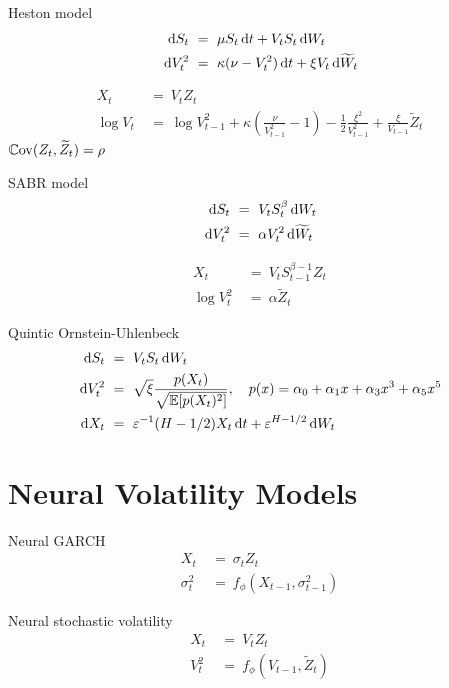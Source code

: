 Heston model
\begin{align*}
\, \textrm{d} S_t ~ &= ~ \mu S_t \, \textrm{d} t + V_t S_t \, \textrm{d} W_t \\
\, \textrm{d} V_t^2 ~ &= ~ \kappa(\nu - V_t^2) \, \textrm{d} t + \xi {V_t} \, \textrm{d} \widetilde{W}_t
\end{align*}

\begin{align*}
X_t ~ &= ~ V_t Z_t \\
\log V_t ~ &= ~ \log V_{t-1}^2 + \kappa \left( \frac{\nu}{V_{t-1}^2} - 1 \right) - \frac{1}{2} \frac{\xi^2}{V_{t-1}^2} + \frac{\xi}{V_{t-1}} \widetilde{Z}_t
\end{align*}
$\operatorname{\mathbb{C}ov}(Z_t, \widetilde{Z}_t) = \rho$

SABR model
\begin{align*}
\, \textrm{d} S_t ~ &= ~ V_t S_t^\beta \, \textrm{d} W_t \\
\, \textrm{d} V_t^2 ~ &= ~ \alpha V_t^2 \, \textrm{d} \widetilde{W}_t
\end{align*}

\begin{align*}
X_t ~ &= ~ V_t S_{t-1}^{\beta-1} Z_t \\
\log V_t^2 ~ &= ~ \alpha \widetilde{Z}_t
\end{align*}

Quintic Ornstein-Uhlenbeck
\begin{align*}
\, \textrm{d} S_t ~ &= ~ V_t S_t \, \textrm{d} W_t \\
\, \textrm{d} V_t^2 ~ &= ~ \sqrt{\xi} \frac{p(X_t)}{\sqrt{\operatorname{\mathbb{E}}[p(X_t)^2]}}, \quad p(x) = \alpha_0 + \alpha_1 x + \alpha_3 x^3 + \alpha_5 x^5 \\
\, \textrm{d} X_t ~ &= ~ \varepsilon^{-1} (H - 1/2) X_t \, \textrm{d} t + \varepsilon^{H-1/2} \, \textrm{d} W_t
\end{align*}


\section{Neural Volatility Models}

Neural GARCH
\begin{align*}
X_t ~ &= ~ \sigma_t Z_t \\
\sigma_t^2 ~ &= ~ f_\phi(X_{t-1}, \sigma_{t-1}^2)
\end{align*}

Neural stochastic volatility
\begin{align*}
X_t ~  &= ~ V_t Z_t \\
V_t^2 ~ &= ~ f_\phi(V_{t-1}, \widetilde{Z}_t)
\end{align*}




